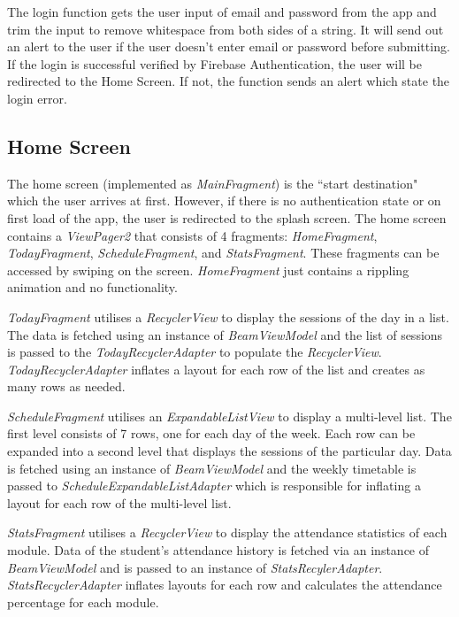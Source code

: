 \documentclass[../report.tex]{subfiles}
\begin{document}


The login function gets the user input of email and password from the app and trim the input to remove whitespace from both sides of a string. It will send out an alert to the user if the user doesn’t enter email or password before submitting. If the login is successful verified by Firebase Authentication, the user will be redirected to the Home Screen. If not, the function sends an alert which state the login error. 

\bigskip
\subsection{Home Screen}
The home screen (implemented as \textit{MainFragment}) is the ``start destination" which the user arrives at first. However, if there is no authentication state or on first load of the app, the user is redirected to the splash screen. The home screen contains a \textit{ViewPager2} that consists of 4 fragments: \textit{HomeFragment}, \textit{TodayFragment}, \textit{ScheduleFragment}, and \textit{StatsFragment}. These fragments can be accessed by swiping on the screen. \textit{HomeFragment} just contains a rippling animation and no functionality. 

\textit{TodayFragment} utilises a \textit{RecyclerView} to display the sessions of the day in a list. The data is fetched using an instance of \textit{BeamViewModel} and the list of sessions is passed to the \textit{TodayRecyclerAdapter} to populate the \textit{RecyclerView}. \textit{TodayRecyclerAdapter} inflates a layout for each row of the list and creates as many rows as needed.

\textit{ScheduleFragment} utilises an \textit{ExpandableListView} to display a multi-level list. The first level consists of 7 rows, one for each day of the week. Each row can be expanded into a second level that displays the sessions of the particular day. Data is fetched using an instance of \textit{BeamViewModel} and the weekly timetable is passed to \textit{ScheduleExpandableListAdapter} which is responsible for inflating a layout for each row of the multi-level list.

\textit{StatsFragment} utilises a \textit{RecyclerView} to display the attendance statistics of each module. Data of the student’s attendance history is fetched via an instance of \textit{BeamViewModel} and is passed to an instance of \textit{StatsRecylerAdapter}. \textit{StatsRecyclerAdapter} inflates layouts for each row and calculates the attendance percentage for each module.
\end{document}
